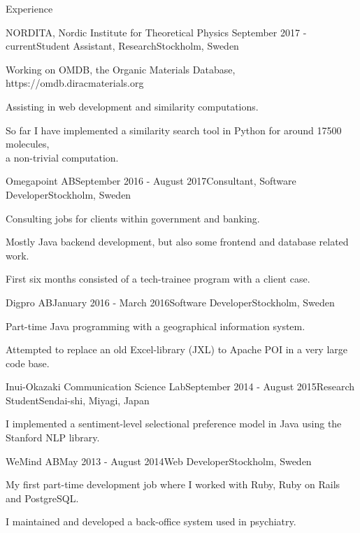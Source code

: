 \documentclass{resume} %
\begin{document}
\begin{rSection}{Experience}

\begin{rSubsection}{NORDITA, Nordic Institute for Theoretical Physics} {September 2017 - current}{Student Assistant, Research}{Stockholm, Sweden}
\item Working on OMDB, the Organic Materials Database, https://omdb.diracmaterials.org
\item Assisting in web development and similarity computations.
\item So far I have implemented a similarity search tool in Python for around 17500 molecules,\\ a non-trivial computation.
\end{rSubsection}

\begin{rSubsection}{Omegapoint AB}{September 2016 - August 2017}{Consultant, Software Developer}{Stockholm, Sweden}
\item Consulting jobs for clients within government and banking. 
\item Mostly Java backend development, but also some frontend and database related work.
\item First six months consisted of a tech-trainee program with a client case.
\end{rSubsection}


\begin{rSubsection}{Digpro AB}{January 2016 - March 2016}{Software Developer}{Stockholm, Sweden}
\item Part-time Java programming with a geographical information system.
\item Attempted to replace an old Excel-library (JXL) to Apache POI in a very large code base.
\end{rSubsection}


\begin{rSubsection}{Inui-Okazaki Communication Science Lab}{September 2014 - August 2015}{Research Student}{Sendai-shi, Miyagi, Japan}
\item I implemented a sentiment-level selectional preference model in Java using the Stanford NLP library.
\end{rSubsection}


\begin{rSubsection}{WeMind AB}{May 2013 - August 2014}{Web Developer}{Stockholm, Sweden}
\item My first part-time development job where I worked with Ruby, Ruby on Rails and PostgreSQL.
\item I maintained and developed a back-office system used in psychiatry.
\end{rSubsection}

\end{rSection}
\end{document}
